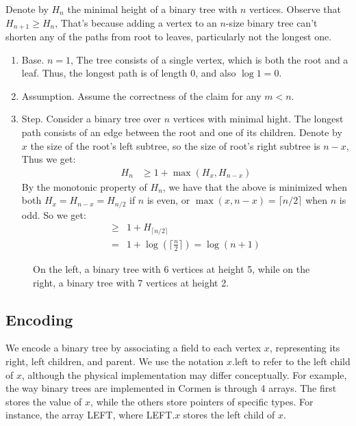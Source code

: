     Denote by $H_{n}$ the minimal height of a binary tree with $n$ vertices. Observe that $H_{n+1} \ge H_{n}$, That's because adding a vertex to an $n$-size binary tree can't shorten any of the paths from root to leaves, particularly not the longest one.
    \begin{enumerate}
      \item Base. $n=1$, The tree consists of a single vertex, which is both the root and a leaf. Thus, the longest path is of length $0$, and also $\log 1 = 0$.
      \item Assumption. Assume the correctness of the claim for any $m < n$. 
      \item Step. Consider a binary tree over $n$ vertices with minimal hight. The longest path consists of an edge between the root and one of its children. Denote by $x$ the size of the root's left subtree, so the size of root's right subtree is $n-x$, Thus we get:
        \begin{equation*}
          \begin{split}
            H_{n} & \ge 1 + \max \left( H_{x}, H_{n-x} \right) 
          \end{split}
        \end{equation*}
By the monotonic property of $H_{n}$, we have that the above is minimized when both $H_{x}=H_{n-x}=H_{n/2}$ if $n$ is even, or $\max(x,n-x) = \lceil n/2 \rceil$ when $n$ is odd. So we get:
        \begin{equation*}
          \begin{split}
            \ge & 1 + H_{\lceil n/2 \rceil} \\ 
            = & 1 + \log(\lceil \frac{n}{2} \rceil ) = \log(n+1)
          \end{split}
        \end{equation*}
    \end{enumerate}


    \begin{figure}[h]
      \centering
      
      \caption{ On the left, a binary tree with 6 vertices at height 5, while on the right, a binary tree with 7 vertices at height 2. }
      \label{fig:<+label+>}
    \end{figure}


    \subsection{Encoding}

We encode a binary tree by associating a field to each vertex $x$, representing its right, left children, and parent. We use the notation $x$.left to refer to the left child of $x$, although the physical implementation may differ conceptually. For example, the way binary trees are implemented in Cormen is through 4 arrays. The first stores the value of $x$, while the others store pointers of specific types. For instance, the array LEFT, where LEFT.$x$ stores the left child of $x$.


